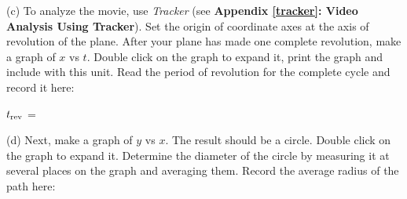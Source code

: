 %
%
(c) To analyze the movie, use \textit{Tracker} (see \textbf{Appendix \ref{tracker}: Video Analysis Using Tracker}). 
Set the origin of coordinate axes at the axis of revolution of the plane.  After your plane has made one complete revolution, make a graph of $x$ vs $t$. Double click on the graph to expand it, print the graph and include with this unit. Read the period of revolution for the complete cycle and record it here:
\vspace{5mm}

\hspace{0.5in} \( t_{\rm rev} \) = 
\vspace{5mm}


%
(d) Next, make a graph of $y$ vs $x$.  The result should be a circle. Double click on the graph to expand it. Determine the diameter of the circle by measuring it at several places on the graph and averaging them. Record the average radius of the path here:
\vspace{5mm}

